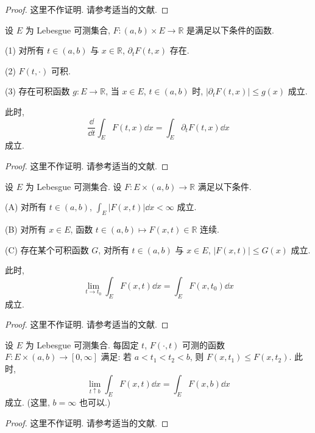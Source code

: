 \begin{proof}
这里不作证明. 请参考适当的文献.
\end{proof}

\begin{theorem}\label{thm:2.6}
设 $E$ 为 Lebesgue 可测集合, $F: (a, b) \times E \to \mathbb{R}$ 是满足以下条件的函数.

(1) 对所有 $t \in (a, b)$ 与 $x \in \mathbb{R}$, $\partial_{t}F(t, x)$ 存在.

(2) $F(t, \cdot)$ 可积.

(3) 存在可积函数 $g: E \to \mathbb{R}$, 当 $x \in E$, $t \in (a, b)$ 时, $|\partial_{t}F(t, x)| \leq g(x)$ 成立.

此时,
\begin{equation}\tag{2.5}
\frac{\dd}{\dd t}\int_{E}F(t, x)\dd x = \int_{E}\partial_{t}F(t, x)\dd x
\label{eq:2.5}
\end{equation}
成立.
\end{theorem}

\begin{proof}
这里不作证明. 请参考适当的文献.
\end{proof}

\begin{theorem}\label{thm:2.7}
设 $E$ 为 Lebesgue 可测集合. 设 $F: E \times (a, b) \to \mathbb{R}$ 满足以下条件.

(A) 对所有 $t \in (a, b)$, $\int_{E}|F(x, t)|\dd x < \infty$ 成立.

(B) 对所有 $x \in E$, 函数 $t \in (a, b) \mapsto F(x, t) \in \mathbb{R}$ 连续.

(C) 存在某个可积函数 $G$, 对所有 $t \in (a, b)$ 与 $x \in E$, $|F(x, t)| \leq G(x)$ 成立.

此时,
\[
\lim_{t \to t_{0}}\int_{E}F(x, t)\dd x = \int_{E}F(x, t_{0})\dd x
\]
成立.
\end{theorem}

\begin{proof}
这里不作证明. 请参考适当的文献.
\end{proof}

\begin{theorem}\label{thm:2.8}
设 $E$ 为 Lebesgue 可测集合. 每固定 $t$, $F(\cdot, t)$ 可测的函数 $F: E \times (a, b) \to [0, \infty]$ 满足: 若 $a < t_{1} < t_{2} < b$, 则 $F(x, t_{1}) \leq F(x, t_{2})$. 此时,
\[
\lim_{t \uparrow b}\int_{E}F(x, t)\dd x = \int_{E}F(x, b)\dd x
\]
成立. (这里, $b = \infty$ 也可以.)
\end{theorem}

\begin{proof}
这里不作证明. 请参考适当的文献.
\end{proof}

